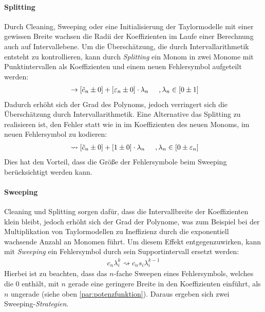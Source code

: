     

\paragraph{Splitting}
Durch Cleaning, Sweeping oder eine Initialisierung der Taylormodelle mit einer gewissen Breite wachsen die Radii der Koeffizienten im Laufe einer Berechnung auch auf Intervallebene. Um die Überschätzung, die durch Intervallarithmetik entsteht zu kontrollieren, kann durch \textit{Splitting} ein Monom in zwei Monome mit Punktintervallen als Koeffizienten und einem neuen Fehlersymbol aufgeteilt werden:
\begin{align*}
[\tilde{c}_n \pm \varepsilon_n]\ \rightarrow [\tilde{c}_n \pm 0] + [\varepsilon_n \pm 0]\cdot  \lambda_n \hspace{0.5cm}, \lambda_n \in [0 \pm 1]
\end{align*}
Dadurch erhöht sich der Grad des Polynoms, jedoch verringert sich die Überschätzung durch Intervallarithmetik. Eine Alternative das Splitting zu realisieren ist, den Fehler statt wie in \cite{DBLP:conf/macis/BrausseKM15} im Koeffizienten des neuen Monoms, im neuen Fehlersymbol zu kodieren:
\begin{align*}
 [\tilde{c}_n \pm \varepsilon_n]\ \rightsquigarrow [\tilde{c}_n \pm 0] + [1 \pm 0]\cdot  \lambda_n \hspace{0.5cm}, \lambda_n \in [0 \pm \varepsilon_n]
\end{align*}
Dies hat den Vorteil, dass die Größe der Fehlersymbole beim Sweeping berücksichtigt werden kann.

\paragraph{Sweeping}
Cleaning und Splitting sorgen dafür, dass die Intervallbreite der Koeffizienten klein bleibt, jedoch erhöht sich der Grad der Polynome, was zum Beispiel bei der Multiplikation von Taylormodellen zu Ineffizienz durch die exponentiell wachsende Anzahl an Monomen führt. Um diesem Effekt entgegenzuwirken, kann mit \textit{Sweeping} ein Fehlersymbol durch sein Supportintervall ersetzt werden:
\begin{align*}
 c_n \lambda_i^k \rightsquigarrow c_n s_i \lambda_i^{k-1}
\end{align*}
Hierbei ist zu beachten, dass das $n$-fache Sweepen eines Fehlersymbols, welches die 0 enthält, mit $n$ gerade eine geringere Breite in den Koeffizienten einführt, als $n$ ungerade (siehe oben \ref{par:potenzfunktion}). Daraus ergeben sich zwei Sweeping-\textit{Strategien}.

